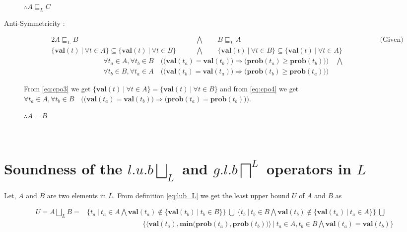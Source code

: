 \documentclass[final,3p, review, times]{Elsevier/elsarticle}
\begin{document}
\begin{description}
	$\therefore A\sqsubseteq_L C$
\item[Anti-Symmetricity :] \hfill
\begin{alignat}{2}
    A\sqsubseteq_L B &\qquad\bigwedge\qquad B\sqsubseteq_L A\qquad\qquad\qquad\qquad\qquad\qquad\qquad\qquad\qquad\qquad\text{(Given)}\nonumber\\
    \Big\{\mathbf{val}(t)\ \big|\ \forall t\in A\Big\}\subseteq\Big\{\mathbf{val}(t)\ \big|\ \forall t\in B\Big\} &\qquad\bigwedge\qquad \Big\{\mathbf{val}(t)\ \big|\ \forall t\in B\Big\}\subseteq\Big\{\mathbf{val}(t)\ \big|\ \forall t\in A\Big\}\label{eq:cpo3}
\end{alignat}
\begin{align}
	\forall t_a\in A,\forall t_b\in B\quad\bigg(\Big(\mathbf{val}(t_a)=\mathbf{val}(t_b)\Big)\Rightarrow\Big(\mathbf{prob}(t_a)\geq\mathbf{prob}(t_b)\Big)\bigg)\quad\bigwedge\nonumber\\
	\forall t_b\in B,\forall t_a\in A\quad\bigg(\Big(\mathbf{val}(t_b)=\mathbf{val}(t_a)\Big)\Rightarrow\Big(\mathbf{prob}(t_b)\geq\mathbf{prob}(t_a)\Big)\bigg)\qquad\ \ &\label{eq:cpo4}
\end{align}

	From \ref{eq:cpo3} we get $\Big\{\mathbf{val}(t)\ \big|\ \forall t\in A\Big\}=\Big\{\mathbf{val}(t)\ \big|\ \forall t\in B\Big\}$ and from \ref{eq:cpo4} we get\\
\noindent$\forall t_a\in A,\forall t_b\in B\quad\bigg(\Big(\mathbf{val}(t_a)=\mathbf{val}(t_b)\Big)\Rightarrow\Big(\mathbf{prob}(t_a)=\mathbf{prob}(t_b)\Big)\bigg)$.
	
	$\therefore A=B$
\end{description}









\section{\\Soundness of the $l.u.b \displaystyle\bigsqcup_L$ and $g.l.b \displaystyle\bigsqcap^L$ operators in $L$}
\label{app:concrete_ub}

Let, $A$ and $B$ are two elements in $L$. From definition \ref{eq:lub_L} we get the least upper bound $U$ of $A$ and $B$ as

\begin{align}
U=A\bigsqcup_L B=&\Big\{t_a\ \big|\  t_a\in A\bigwedge \mathbf{val}(t_a)\notin \big\{\mathbf{val}(t_b)\ |\ t_b\in B\big\}\Big\}\ \bigcup\ \Big\{t_b\ \big|\  t_b\in B\bigwedge \mathbf{val}(t_b)\notin \big\{\mathbf{val}(t_a)\ |\ t_a\in A\big\}\Big\}\ \bigcup&\nonumber\\
    &\qquad\qquad\qquad\qquad\Big\{\big\langle\mathbf{val}(t_a),\mathbf{min}\big(\mathbf{prob}(t_a),\mathbf{prob}(t_b)\big)\big\rangle\ \big|\  t_a\in A, t_b\in B\bigwedge \mathbf{val}(t_a)=\mathbf{val}(t_b)\Big\}\label{eq:ub_L1}&
\end{align}
\end{document}

